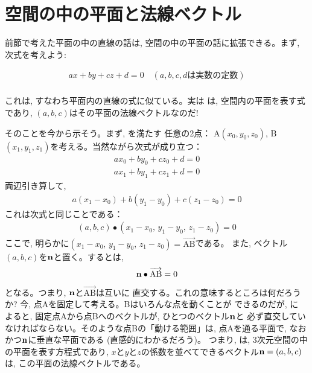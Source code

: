 \section{空間の中の平面と法線ベクトル}

前節で考えた平面の中の直線の話は, 空間の中の平面の話に拡張できる。まず, 次式を考えよう:

\begin{eqnarray}
ax+by+cz+d=0\,\,\,\,\,\, (a, b, c, d\text{は実数の定数})\nonumber\\\label{eq:plane_ax_by_cz_d}
\end{eqnarray}

これは, すなわち平面内の直線の式に似ている。実は
は, 空間内の平面を表す式であり, $(a, b, c)$はその平面の法線ベクトルなのだ!

そのことを今から示そう。まず, を満たす
任意の2点： A$(x_0, y_0, z_0)$, B$(x_1, y_1, z_1)$を考える。当然ながら次式が成り立つ：
\begin{eqnarray}
ax_0+by_0+cz_0+d=0 \\
ax_1+by_1+cz_1+d=0\label{eq:vect_plane_inprod2}
\end{eqnarray}
両辺引き算して, 
\begin{eqnarray}
a(x_1-x_0)+b(y_1-y_0)+c(z_1-z_0)=0
\end{eqnarray}
これは次式と同じことである：
\begin{eqnarray}
(a, b, c) \bullet (x_1-x_0,\, y_1-y_0,\, z_1-z_0)=0\label{eq:vect_plane_inprod4}
\end{eqnarray}
ここで, 明らかに$(x_1-x_0,\, y_1-y_0,\, z_1-z_0)=\overrightarrow{\text{AB}}$である。
また, ベクトル$(a, b, c)$を${\bf n}$と置く。するとは, 
\begin{eqnarray}
{\bf n} \bullet \overrightarrow{\text{AB}}=0\label{eq:vect_plane_inprod6}
\end{eqnarray}
となる。つまり, ${\bf n}$と$\overrightarrow{\text{AB}}$は互いに
直交する。これの意味するところは何だろうか?
今, 点Aを固定して考える。Bはいろんな点を動くことが
できるのだが, に
よると, 固定点Aから点Bへのベクトルが, ひとつのベクトル${\bf n}$と
必ず直交していなければならない。そのような点Bの「動ける範囲」は, 
点Aを通る平面で, なおかつ${\bf n}$に垂直な平面である (直感的にわかるだろう)。
つまり, は, 3次元空間の中の平面を表す方程式であり, 
$x$と$y$と$z$の係数を並べてできるベクトル${\bf n}=(a, b, c)$は, この平面の法線ベクトルである。\hv

